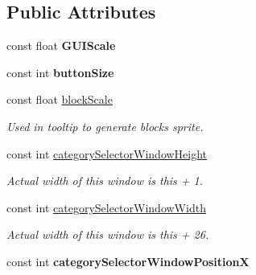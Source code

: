 \subsection*{Public Attributes}
\begin{DoxyCompactItemize}
\item 
\hypertarget{classArchitectModeAllocation_adffb43e10974575bc16d639c17b95c70}{const float {\bfseries G\-U\-I\-Scale}}\label{classArchitectModeAllocation_adffb43e10974575bc16d639c17b95c70}

\item 
\hypertarget{classArchitectModeAllocation_aa1fbd0aef9eadb12152ecbc60497c4c5}{const int {\bfseries button\-Size}}\label{classArchitectModeAllocation_aa1fbd0aef9eadb12152ecbc60497c4c5}

\item 
\hypertarget{classArchitectModeAllocation_a9dedfd6ac1214bd502f1f861c64eb420}{const float \hyperlink{classArchitectModeAllocation_a9dedfd6ac1214bd502f1f861c64eb420}{block\-Scale}}\label{classArchitectModeAllocation_a9dedfd6ac1214bd502f1f861c64eb420}

\begin{DoxyCompactList}\small\item\em Used in tooltip to generate blocks sprite. \end{DoxyCompactList}\item 
\hypertarget{classArchitectModeAllocation_a5057812ce4cf3ec872985af415f977ca}{const int \hyperlink{classArchitectModeAllocation_a5057812ce4cf3ec872985af415f977ca}{category\-Selector\-Window\-Height}}\label{classArchitectModeAllocation_a5057812ce4cf3ec872985af415f977ca}

\begin{DoxyCompactList}\small\item\em Actual width of this window is this + 1. \end{DoxyCompactList}\item 
\hypertarget{classArchitectModeAllocation_af786648054c9487ded00409b5c52bbc2}{const int \hyperlink{classArchitectModeAllocation_af786648054c9487ded00409b5c52bbc2}{category\-Selector\-Window\-Width}}\label{classArchitectModeAllocation_af786648054c9487ded00409b5c52bbc2}

\begin{DoxyCompactList}\small\item\em Actual width of this window is this + 26. \end{DoxyCompactList}\item 
\hypertarget{classArchitectModeAllocation_afb6fe20a4c831969e0d9db4bbc15834d}{const int {\bfseries category\-Selector\-Window\-Position\-X}}\label{classArchitectModeAllocation_afb6fe20a4c831969e0d9db4bbc15834d}


\end{DoxyCompactItemize}
